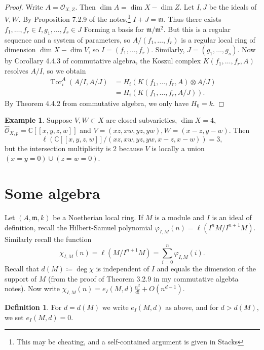 \documentclass{amsart}
\theoremstyle{definition}
\newtheorem{defn}[thm]{Definition}
\newtheorem{exm}[thm]{Example}
\theoremstyle{remark}
\theoremstyle{plain}
\theoremstyle{definition}
\theoremstyle{remark}
\newcommand{\C}{\mathbb{C}}
\newcommand{\msc}[1]{\mathscr{#1}}
\newcommand{\mf}[1]{\mathfrak{#1}}
\newcommand{\wh}[1]{\widehat{#1}}
\DeclareMathOperator{\Tor}{Tor}
\begin{document}
\begin{proof}
    Write $A = \msc{O}_{X,Z}$. Then $\dim A = \dim X - \dim Z$. Let $I, J$ be the ideals of $V, W$. By Proposition 7.2.9 of the notes,\footnote{This may be cheating, and a self-contained argument is given in Stacks} $I + J = \mf{m}$. Thus there exists $f_1, \ldots, f_r \in I , g_1, \ldots, f_s \in J$ Forming a basis for $\mf{m}/\mf{m}^2$. But this is a regular sequence and a system of parameters, so $A/ (f_1, \ldots, f_r)$ is a regular local ring of dimension $\dim X - \dim V$, so $I = (f_1, \ldots, f_r)$. Similarly, $J = (g_1, \ldots, g_s)$. Now by Corollary 4.4.3 of commutative algebra, the Koszul complex $K(f_1, \ldots, f_r, A)$ resolves $A/I$, so we obtain
    \begin{align*}
        \Tor_i^A(A/I, A/J) &= H_i (K(f_1, \ldots, f_r, A) \otimes A/J) \\
                           &= H_i (K(f_1, \ldots, f_r, A/J)).
    \end{align*}
    By Theorem 4.4.2 from commutative algebra, we only have $H_0 = k$.
\end{proof}

\begin{exm}
    Suppose $V, W \subset X$ are closed subvarieties, $\dim X = 4$, $\wh{\msc{O}}_{X,p} = \C[[x,y,z,w]]$ and $V = (xz,xw,yz,yw), W = (x-z,y-w)$. Then 
    \[ \ell(\C[[x,y,z,w]]/(xz,xw,yz,yw,x-z,x-w)) = 3,\] 
    but the intersection multiplicity is $2$ because $V$ is locally a union $(x=y=0) \cup (z=w=0)$.
\end{exm}

\section{Some algebra}%
\label{sec:some_algebra}

Let $(A, \mf{m}, k)$ be a Noetherian local ring. If $M$ is a module and $I$ is an ideal of definition, recall the Hilbert-Samuel polynomial $\varphi_{I,M}(n) = \ell(I^n M / I^{n+1} M)$. Similarly recall the function 
\[ \chi_{I,M}(n) = \ell(M/I^{n+1} M) = \sum_{i=0}^n \varphi_{I,M}(i). \]
Recall that $d(M) \coloneqq \deg \chi$ is independent of $I$ and equals the dimension of the support of $M$ (from the proof of Theorem 3.2.9 in my commutative algebta notes). Now write $\chi_{I,M}(n) = e_I(M, d) \frac{n^d}{d!} + O(n^{d-1})$.

\begin{defn}
    For $d = d(M)$ we write $e_I(M, d)$ as above, and for $d > d(M)$, we set $e_I(M,d) = 0$.
\end{defn}
\end{document}
